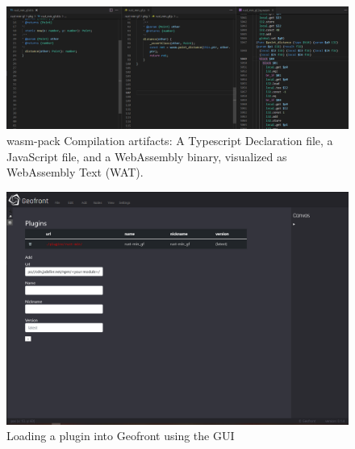 \begin{figure}
  \centering
  \includegraphics[width=\linewidth]{13.PNG}
  \caption[compilation artifacts]{wasm-pack Compilation artifacts: A Typescript Declaration file, a JavaScript file, and a WebAssembly binary, visualized as WebAssembly Text (WAT). }
  \label{fig:rust-plugin:compilation-results}
\end{figure}

\begin{figure}
  \graphicspath{{../../assets/images/6.1.1/}}
  \centering
  \includegraphics[width=0.50\linewidth]{2.PNG}
  \caption[loading a plugin]{Loading a plugin into Geofront using the \ac{GUI}}
  \label{fig:min-rust-plugin-import}
\end{figure}

